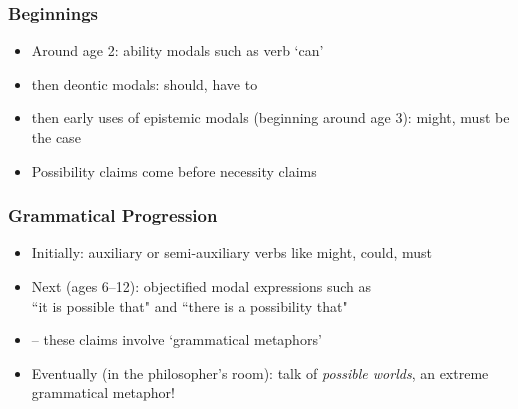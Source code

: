 \begin{frame}
\frametitle{Beginnings}

\begin{itemize}[<+->]

\item Around age 2: ability modals such as verb `can'

\item then deontic modals: should, have to

\item then early uses of epistemic modals (beginning around age 3): might, must be the case

\item Possibility claims come before necessity claims


\end{itemize}
\end{frame}

\begin{frame}
\frametitle{Grammatical Progression}

\begin{itemize}[<+->]

\item Initially: auxiliary or semi-auxiliary verbs like might, could, must

\item Next (ages 6--12): objectified modal expressions such as \\  ``it is possible that" and ``there is a possibility that"
\item[] -- these claims involve `grammatical metaphors'

\item Eventually (in the philosopher's room): talk of \textit{possible worlds}, an extreme grammatical metaphor!

\end{itemize}
\end{frame}

